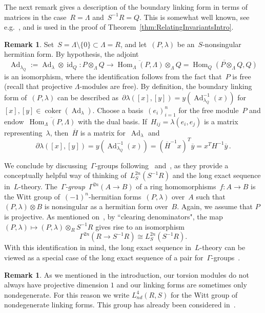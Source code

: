 \documentclass[10.9pt,a4paper]{amsart}
\theoremstyle{definition}
\newtheorem{remark}[theorem]{Remark}
\theoremstyle{remark}
\newcommand{\id}{\operatorname{id}}
\newcommand{\coker}{\operatorname{coker}}
\newcommand{\Hom}{\operatorname{Hom}}
\newcommand{\Ad}{\operatorname{Ad}}
\begin{document}
The next remark gives a description of the boundary linking form in terms of matrices in the case~$R=\Lambda$ and~$S^{-1}R=Q$.
This is somewhat well known, see e.g.~\cite[Remark 2.4]{ConwayPowell},  and is used in the proof of Theorem~\ref{thm:RelatingInvariantsIntro}.


\begin{remark}
\label{rem:AlternativeDefinitionBoundaryLinking}
Set~$S=\Lambda\setminus\{0\}\subset\Lambda=R$, and let~$(P,\lambda)$ be an~$S$-nonsingular hermitian form.
By hypothesis, the adjoint
\[
\Ad_{\lambda_Q}:=\Ad_\lambda\otimes \id_Q\colon P\otimes_\Lambda Q\to \overline{\Hom_\Lambda(P,\Lambda)}\otimes_\Lambda Q=\overline{\Hom_Q(P\otimes_\Lambda Q,Q)}
\]
 is an isomorphism, where the identification follows from the fact that~$P$ is free (recall that projective $\Lambda$-modules are free).
 By definition, the boundary linking form of~$(P,\lambda)$ can be described as~$\partial \lambda([x],[y])=y (\Ad_{\lambda_Q}^{-1}(x))$ for~$[x],[y] \in \coker(\Ad_\lambda)$.
Choose a basis~$(e_i)_{i=1}^n$ for the free module~$P$ and endow~$\overline{\Hom_\Lambda(P,\Lambda)}$ with the dual basis.
If~$H_{ij}=\lambda(e_i,e_j)$ is a matrix representing~$\lambda$, then~$\overline{H}$ is a matrix for~$\Ad_\lambda$ and
\[
\partial \lambda([x],[y])
=y (\Ad_{\lambda_Q}^{-1}(x))
=(\overline{H}^{-1}x)^T\overline{y}
=x^TH^{-1}\overline{y}\,.
\]
 \end{remark}
 
 We conclude by discussing~$\Gamma$-groups following~\cite{CappellShaneson} and~\cite[page 150]{Ranicki}, as they provide a conceptually helpful way of thinking of~$L_S^{2n}(S^{-1}R)$ and the long exact sequence in~$L$-theory.
 The\emph{~$\Gamma$-group}~$\Gamma^{2n}(A \to B)$ of a ring homomorphisms~$f \colon A \to B$ is the Witt group of~$(-1)^n$-hermitian forms~$(P,\lambda)$ over~$A$ such that~$(P,\lambda) \otimes B$ is nonsingular as a hermitian form over~$B$.
 Again, we assume that $P$ is projective.
As mentioned on~\cite[page 209]{Ranicki},  by ``clearing denominators",  the map~$(P,\lambda) \mapsto (P,\lambda) \otimes_R S^{-1}R$ gives rise to an isomorphism
$$\Gamma^{2n}(R \to S^{-1}R) \cong L_S^{2n}(S^{-1}R).$$
With this identification in mind, the long exact sequence in~$L$-theory can be viewed as a special case of the long exact sequence of a pair for~$\Gamma$-groups~\cite{CappellShaneson,Ranicki}.

\begin{remark}
As we mentioned in the introduction, our torsion modules do not always have projective dimension $1$ and our linking forms are sometimes only nondegenerate.
For this reason we write $L^4_\textit{nd}(R,S)$ for the Witt group of nondegenerate linking forms.
This group has already been considered in~\cite{Hillman,BorodzikFriedlPowell}.
\end{remark}
\end{document}
